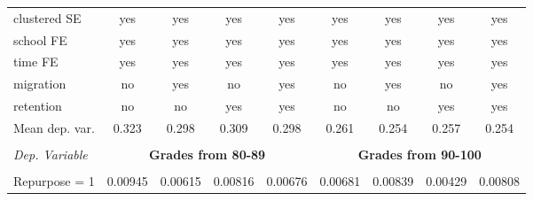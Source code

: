 \documentclass[12pt]{article}
\theoremstyle{plain}
\theoremstyle{plain}
\theoremstyle{plain}
\theoremstyle{definition}
\theoremstyle{plain}
\theoremstyle{definition}
\theoremstyle{plain}
\theoremstyle{remark}
\theoremstyle{definition}
\theoremstyle{definition}
\theoremstyle{plain}
\begin{document}
\begin{table}[H]
{\begin{tabular}{p{14.835em}llllllll}
			\multicolumn{1}{l}{clustered SE} & \multicolumn{1}{c}{yes} & \multicolumn{1}{c}{yes} & \multicolumn{1}{c}{yes} & \multicolumn{1}{c}{yes} & \multicolumn{1}{c}{yes} & \multicolumn{1}{c}{yes} & \multicolumn{1}{c}{yes} & \multicolumn{1}{c}{yes} \\
			\multicolumn{1}{l}{school FE} & \multicolumn{1}{c}{yes} & \multicolumn{1}{c}{yes} & \multicolumn{1}{c}{yes} & \multicolumn{1}{c}{yes} & \multicolumn{1}{c}{yes} & \multicolumn{1}{c}{yes} & \multicolumn{1}{c}{yes} & \multicolumn{1}{c}{yes} \\
			\multicolumn{1}{l}{time FE} & \multicolumn{1}{c}{yes} & \multicolumn{1}{c}{yes} & \multicolumn{1}{c}{yes} & \multicolumn{1}{c}{yes} & \multicolumn{1}{c}{yes} & \multicolumn{1}{c}{yes} & \multicolumn{1}{c}{yes} & \multicolumn{1}{c}{yes} \\
			\multicolumn{1}{l}{migration} & \multicolumn{1}{c}{no} & \multicolumn{1}{c}{yes} & \multicolumn{1}{c}{no} & \multicolumn{1}{c}{yes} & \multicolumn{1}{c}{no} & \multicolumn{1}{c}{yes} & \multicolumn{1}{c}{no} & \multicolumn{1}{c}{yes} \\
			\multicolumn{1}{l}{retention} & \multicolumn{1}{c}{no} & \multicolumn{1}{c}{no} & \multicolumn{1}{c}{yes} & \multicolumn{1}{c}{yes} & \multicolumn{1}{c}{no} & \multicolumn{1}{c}{no} & \multicolumn{1}{c}{yes} & \multicolumn{1}{c}{yes} \\
			\multicolumn{1}{l}{Mean dep. var.} & \multicolumn{1}{c}{0.323} & \multicolumn{1}{c}{0.298} & \multicolumn{1}{c}{0.309} & \multicolumn{1}{c}{0.298} & \multicolumn{1}{c}{0.261} & \multicolumn{1}{c}{0.254} & \multicolumn{1}{c}{0.257} & \multicolumn{1}{c}{0.254} \\
			\midrule
			\multicolumn{1}{r}{} &       &       &       &       &       &       &       &  \\
			\midrule
			\multicolumn{1}{l}{\textit{Dep. Variable}} & \multicolumn{4}{c}{\textbf{Grades from 80-89}} & \multicolumn{4}{c}{\textbf{Grades from 90-100}} \\
			\midrule
			\multicolumn{1}{r}{} & \multicolumn{1}{c}{} & \multicolumn{1}{c}{} & \multicolumn{1}{c}{} & \multicolumn{1}{c}{} & \multicolumn{1}{c}{} & \multicolumn{1}{c}{} & \multicolumn{1}{c}{} & \multicolumn{1}{c}{} \\
			\multicolumn{1}{l}{Repurpose = 1} & \multicolumn{1}{c}{0.00945} & \multicolumn{1}{c}{0.00615} & \multicolumn{1}{c}{0.00816} & \multicolumn{1}{c}{0.00676} & \multicolumn{1}{c}{0.00681} & \multicolumn{1}{c}{0.00839} & \multicolumn{1}{c}{0.00429} & \multicolumn{1}{c}{0.00808} \\

\end{tabular}}
\end{table}
\end{document}

